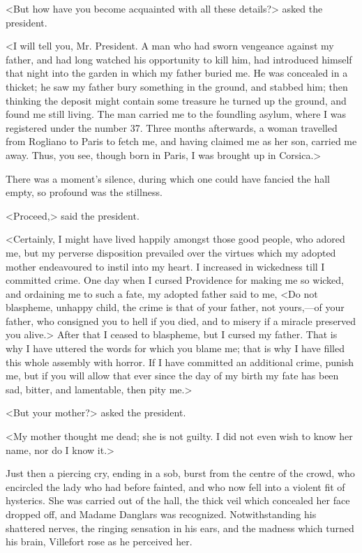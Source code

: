  <But how have you become acquainted with all these details?> asked the president. 

 <I will tell you, Mr. President. A man who had sworn vengeance against my father, and had long watched his opportunity to kill him, had introduced himself that night into the garden in which my father buried me. He was concealed in a thicket; he saw my father bury something in the ground, and stabbed him; then thinking the deposit might contain some treasure he turned up the ground, and found me still living. The man carried me to the foundling asylum, where I was registered under the number 37. Three months afterwards, a woman travelled from Rogliano to Paris to fetch me, and having claimed me as her son, carried me away. Thus, you see, though born in Paris, I was brought up in Corsica.> 

 There was a moment's silence, during which one could have fancied the hall empty, so profound was the stillness. 

 <Proceed,> said the president. 

 <Certainly, I might have lived happily amongst those good people, who adored me, but my perverse disposition prevailed over the virtues which my adopted mother endeavoured to instil into my heart. I increased in wickedness till I committed crime. One day when I cursed Providence for making me so wicked, and ordaining me to such a fate, my adopted father said to me, <Do not blaspheme, unhappy child, the crime is that of your father, not yours,—of your father, who consigned you to hell if you died, and to misery if a miracle preserved you alive.> After that I ceased to blaspheme, but I cursed my father. That is why I have uttered the words for which you blame me; that is why I have filled this whole assembly with horror. If I have committed an additional crime, punish me, but if you will allow that ever since the day of my birth my fate has been sad, bitter, and lamentable, then pity me.> 

 <But your mother?> asked the president. 

 <My mother thought me dead; she is not guilty. I did not even wish to know her name, nor do I know it.> 

 Just then a piercing cry, ending in a sob, burst from the centre of the crowd, who encircled the lady who had before fainted, and who now fell into a violent fit of hysterics. She was carried out of the hall, the thick veil which concealed her face dropped off, and Madame Danglars was recognized. Notwithstanding his shattered nerves, the ringing sensation in his ears, and the madness which turned his brain, Villefort rose as he perceived her. 

